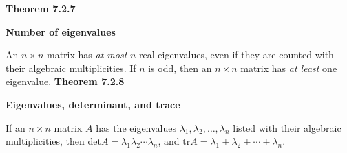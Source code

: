 \textbf{Theorem 7.2.7}\\
\par\noindent\textbf{Number of eigenvalues}
\par\noindent An $n\times{}n$ matrix has \textit{at most} $n$ real eigenvalues, even if they are counted with their algebraic multiplicities. If $n$ is odd, then an $n\times{}n$ matrix has \textit{at least} one eigenvalue.
\textbf{Theorem 7.2.8}\\
\par\noindent\textbf{Eigenvalues, determinant, and trace}
\par\noindent If an $n\times{}n$ matrix $A$ has the eigenvalues $\lambda{}_{1},\lambda{}_{2},\ldots{},\lambda{}_{n}$ listed with their algebraic multiplicities, then $\textrm{det}A=\lambda{}_{1}\lambda{}_{2}\cdots{}\lambda{}_{n}$, and $\textrm{tr}A=\lambda{}_{1}+\lambda{}_{2}+\cdots{}+\lambda{}_{n}$.

